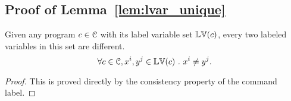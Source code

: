   \subsection{Proof of Lemma~\ref{lem:lvar_unique}}
  \label{apdx:lvar_unique}
  \begin{lemma}
    Given any program $c \in \mathcal{C}$ with its label variable set $\mathbb{LV}(c)$,
    every two labeled variables in this set are different.
    \[
      \forall c \in \mathcal{C}, x^i, y^j \in \mathbb{LV}(c) ~.~ x^i \neq y^j.
      \]
  \end{lemma}
  \begin{proof}
    This is proved directly by the consistency property of the command label.
  \end{proof}
  

